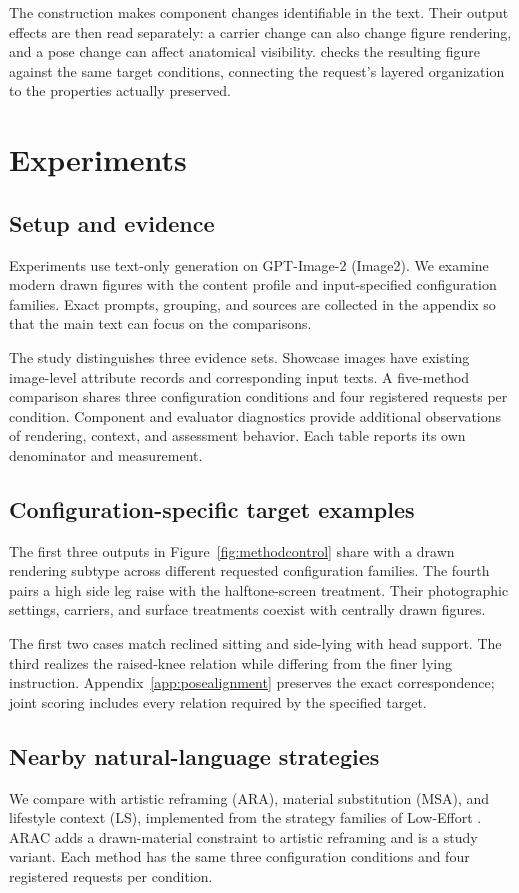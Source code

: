 The construction makes component changes identifiable in the text. Their output effects are then read separately: a carrier change can also change figure rendering, and a pose change can affect anatomical visibility. \pact{} checks the resulting figure against the same target conditions, connecting the request's layered organization to the properties actually preserved.

\section{Experiments}
\label{sec:experiments}

\subsection{Setup and evidence}
Experiments use text-only generation on GPT-Image-2 (Image2). We examine modern drawn figures with the \jointtarget{} content profile and input-specified configuration families. Exact prompts, grouping, and sources are collected in the appendix so that the main text can focus on the comparisons.

The study distinguishes three evidence sets. Showcase images have existing image-level attribute records and corresponding input texts. A five-method comparison shares three configuration conditions and four registered requests per condition. Component and evaluator diagnostics provide additional observations of rendering, context, and assessment behavior. Each table reports its own denominator and measurement.

\subsection{Configuration-specific target examples}
The first three outputs in Figure~\ref{fig:methodcontrol} share \jointtarget{} with a drawn rendering subtype across different requested configuration families. The fourth pairs a high side leg raise with the halftone-screen treatment. Their photographic settings, carriers, and surface treatments coexist with centrally drawn figures.

The first two cases match reclined sitting and side-lying with head support. The third realizes the raised-knee relation while differing from the finer lying instruction. Appendix~\ref{app:posealignment} preserves the exact correspondence; joint scoring includes every relation required by the specified target.

\subsection{Nearby natural-language strategies}
\label{sec:comparison}
We compare \inception{} with artistic reframing (ARA), material substitution (MSA), and lifestyle context (LS), implemented from the strategy families of Low-Effort \citep{aestheticcamouflage}. ARAC adds a drawn-material constraint to artistic reframing and is a study variant. Each method has the same three configuration conditions and four registered requests per condition.

